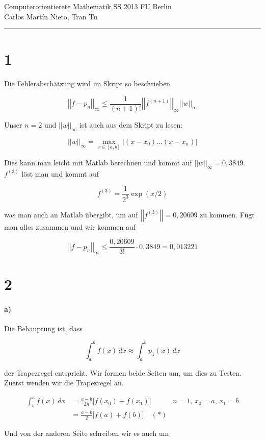 \documentclass[ngerman,a4paper]{scrartcl}
\newcommand{\norm}[1]{\left|\!\left|#1\right|\! \right|}
\begin{document}
{\sffamily
  \hfill
  Computerorientierete Mathematik SS 2013\hfill
  FU Berlin\\[8pt]
  \hfill Carlos Martín Nieto, Tran Tu\hrule \bigskip
}

\section*{1}

Die Fehlerabschätzung wird im Skript so beschrieben

\[
\norm{f - p_n}_\infty \leq \frac{1}{(n+1)!} \norm{f^{(n+1)}}_\infty \norm{w}_\infty
\]

Unser $n=2$ und $\norm{w}_\infty$ ist auch aus dem Skript zu lesen:

\[
\norm{w}_\infty = \max_{x\in [a,b]} \left|(x-x_0) \dots (x-x_n)\right|
\]

Dies kann man leicht mit Matlab berechnen und kommt auf
$\norm{w}_\infty = 0,3849$. $f^{(3)}$ löst man und kommt auf

\[
f^{(3)} = \frac{1}{2^3} \exp(x/2)
\]

was man auch an Matlab übergibt, um auf $\norm{f^{(3)}} = 0,20609$ zu
kommen. Fügt man alles zusammen und wir kommen auf

\[
\norm{f - p_n}_\infty \leq \frac{0,20609}{3!} \cdot 0,3849 = \boxed{0,013221}
\]

\section*{2}

\paragraph{a)}

Die Behauptung ist, dass 

\[
\int^b_a f(x)\, dx \approx \int^b_a p_1(x)\, dx
\]

der Trapezregel entspricht. Wir formen beide Seiten um, um dies zu
Testen. Zuerst wenden wir die Trapezregel an.

\begin{align*}
  \int^a_b f(x)\, dx &= \frac{a-b}{2n} \big[ f(x_0) + f(x_1) \big] & n
  = 1,\, x_0 = a,\, x_1 = b\\
  &= \frac{a-b}{2} \big[f(a) + f(b)\big] \quad (*)
\end{align*}

Und von der anderen Seite schreiben wir es auch um
\end{document}
